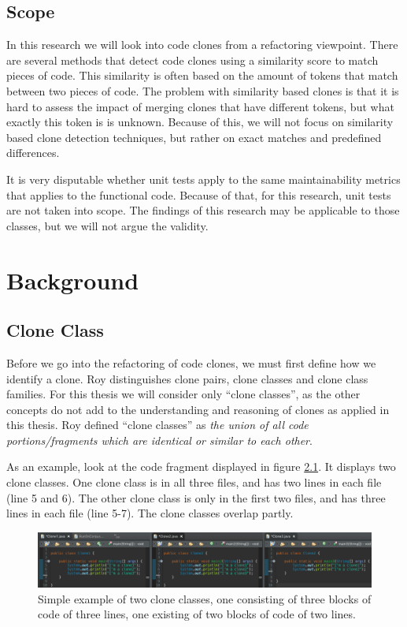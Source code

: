 \documentclass{report}
\theoremstyle{definition}
\theoremstyle{remark}
\begin{document}
\section{Scope}
In this research we will look into code clones from a refactoring viewpoint. There are several methods that detect code clones using a similarity score to match pieces of code. This similarity is often based on the amount of tokens that match between two pieces of code. The problem with similarity based clones is that it is hard to assess the impact of merging clones that have different tokens, but what exactly this token is is unknown. Because of this, we will not focus on similarity based clone detection techniques, but rather on exact matches and predefined differences.

It is very disputable whether unit tests apply to the same maintainability metrics that applies to the functional code. Because of that, for this research, unit tests are not taken into scope. The findings of this research may be applicable to those classes, but we will not argue the validity. %

\chapter{Background}
\section{Clone Class}
Before we go into the refactoring of code clones, we must first define how we identify a clone. Roy \cite{roy2007survey} distinguishes clone pairs, clone classes and clone class families. For this thesis we will consider only ``clone classes'', as the other concepts do not add to the understanding and reasoning of clones as applied in this thesis. Roy defined ``clone classes'' as \textit{the union of all code portions/fragments which are identical or similar to each other}.

As an example, look at the code fragment displayed in figure \ref{fig:cloneclass}. It displays two clone classes. One clone class is in all three files, and has two lines in each file (line 5 and 6). The other clone class is only in the first two files, and has three lines in each file (line 5-7). The clone classes overlap partly.
\begin{figure}[H]
	\includegraphics[width=1\textwidth]{img/clone-class}
	\caption{Simple example of two clone classes, one consisting of three blocks of code of three lines, one existing of two blocks of code of two lines.}
	\label{fig:cloneclass}
\end{figure}
\end{document}
